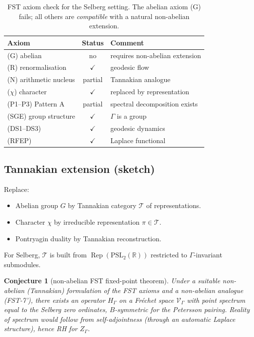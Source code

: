 \documentclass[11pt,a4paper]{article}
\theoremstyle{plain}
\newtheorem{conjecture}[theorem]{Conjecture}
\theoremstyle{definition}
\DeclareMathOperator{\Rep}{Rep}
\newcommand{\R}{\mathbb{R}}
\newcommand{\V}{\mathcal{V}}
\newcommand{\T}{\mathcal{T}}
\newcommand{\chifn}{\chi}
\begin{document}
\begin{table}[h]
\centering
\small
\begin{tabular}{@{}lcl@{}}
\toprule
\textbf{Axiom} & \textbf{Status} & \textbf{Comment} \\
\midrule
(G) abelian & no & requires non-abelian extension \\
(R) renormalisation & $\checkmark$ & geodesic flow \\
(N) arithmetic nucleus & partial & Tannakian analogue \\
($\chifn$) character & $\checkmark$ & replaced by representation \\
(P1--P3) Pattern A & partial & spectral decomposition exists \\
(SGE) group structure & $\checkmark$ & $\Gamma$ is a group \\
(DS1--DS3) & $\checkmark$ & geodesic dynamics \\
(RFEP) & $\checkmark$ & Laplace functional \\
\bottomrule
\end{tabular}
\caption{FST axiom check for the Selberg setting.  The abelian
axiom (G) fails; all others are \emph{compatible} with a natural
non-abelian extension.}
\label{tab:selberg-axioms}
\end{table}

\subsection{Tannakian extension (sketch)}

Replace:
\begin{itemize}
\item Abelian group $G$ by Tannakian category $\T$ of
  representations.
\item Character $\chifn$ by irreducible representation $\pi \in
  \T$.
\item Pontryagin duality by Tannakian reconstruction.
\end{itemize}

For Selberg, $\T$ is built from $\Rep(\mathrm{PSL}_2(\R))$
restricted to $\Gamma$-invariant submodules.

\begin{conjecture}[non-abelian FST fixed-point theorem]
\label{conj:nonabelian-fixed-point}
Under a suitable non-abelian (Tannakian) formulation of the FST
axioms and a non-abelian analogue (FST-7'), there exists an operator
$H_\Gamma$ on a Fr\'echet space $\V_\Gamma$ with point spectrum
equal to the Selberg zero ordinates, $B$-symmetric for the Petersson
pairing.  Reality of spectrum would follow from self-adjointness
(through an automatic Laplace structure), hence RH for $Z_\Gamma$.
\end{conjecture}
\end{document}
